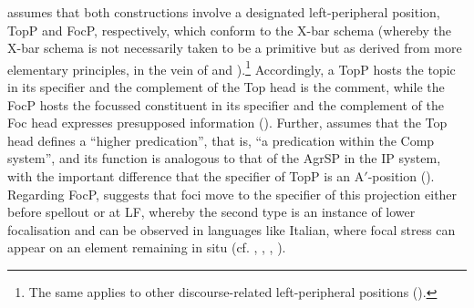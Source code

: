 \citet[286]{rizzi1997} assumes that both constructions involve a designated left-peripheral position, TopP and FocP, respectively, which conform to the X-bar schema (whereby the X-bar schema is not necessarily taken to be a primitive but as derived from more elementary principles, in the vein of \citealt{kayne1994} and \citealt{chomsky1995}).\footnote{The same applies to other discourse-related left-peripheral positions (\citealt[237]{rizzi2004}).} Accordingly, a TopP hosts the topic in its specifier and the complement of the Top head is the comment, while the FocP hosts the focussed constituent in its specifier and the complement of the Foc head expresses presupposed information (\citealt[286--287]{rizzi1997}). Further, \citet[286]{rizzi1997} assumes that the Top head defines a ``higher predication'', that is, ``a predication within the Comp system'', and its function is analogous to that of the AgrSP in the IP system, with the important difference that the specifier of TopP is an A$'$-position (\citealt[286]{rizzi1997}). Regarding FocP, \citet[287]{rizzi1997} suggests that foci move to the specifier of this projection either before spellout or at LF, whereby the second type is an instance of lower focalisation and can be observed in languages like Italian, where focal stress can appear on an element remaining in situ (cf. \citealt{antinuccicinque1977}, \citealt{calabrese1982}, \citealt{cinque1993}, \citealt{bellettishlonsky1995}).

